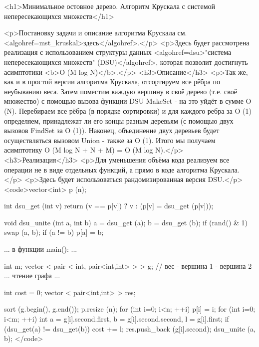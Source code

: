 <h1>Минимальное остовное дерево. Алгоритм Крускала с системой непересекающихся множеств</h1>

<p>Постановку задачи и описание алгоритма Крускала см. <algohref=mst_kruskal>здесь</algohref>.</p>
<p>Здесь будет рассмотрена реализация с использованием структуры данных <algohref=dsu>"система непересекающихся множеств" (DSU)</algohref>, которая позволит достигнуть асимптотики <b>O (M log N)</b>.</p>
<h3>Описание</h3>
<p>Так же, как и в простой версии алгоритма Крускала, отсортируем все рёбра по неубыванию веса. Затем поместим каждую вершину в своё дерево (т.е. своё множество) с помощью вызова функции DSU MakeSet - на это уйдёт в сумме O (N). Перебираем все рёбра (в порядке сортировки) и для каждого ребра за O (1) определяем, принадлежат ли его концы разным деревьям (с помощью двух вызовов FindSet за O (1)). Наконец, объединение двух деревьев будет осуществляться вызовом Union - также за O (1). Итого мы получаем асимптотику O (M log N + N + M) = O (M log N).</p>
<h3>Реализация</h3>
<p>Для уменьшения объёма кода реализуем все операции не в виде отдельных функций, а прямо в коде алгоритма Крускала.</p>
<p>Здесь будет использоваться рандомизированная версия DSU.</p>
<code>vector<int> p (n);

int dsu_get (int v) {
	return (v == p[v]) ? v : (p[v] = dsu_get (p[v]));
}

void dsu_unite (int a, int b) {
	a = dsu_get (a);
	b = dsu_get (b);
	if (rand() & 1)
		swap (a, b);
	if (a != b)
		p[a] = b;
}

... в функции main(): ...

int m;
vector < pair < int, pair<int,int> > > g; // вес - вершина 1 - вершина 2
... чтение графа ...

int cost = 0;
vector < pair<int,int> > res;

sort (g.begin(), g.end());
p.resize (n);
for (int i=0; i<n; ++i)
	p[i] = i;
for (int i=0; i<m; ++i) {
	int a = g[i].second.first,  b = g[i].second.second,  l = g[i].first;
	if (dsu_get(a) != dsu_get(b)) {
		cost += l;
		res.push_back (g[i].second);
		dsu_unite (a, b);
	}
}</code>